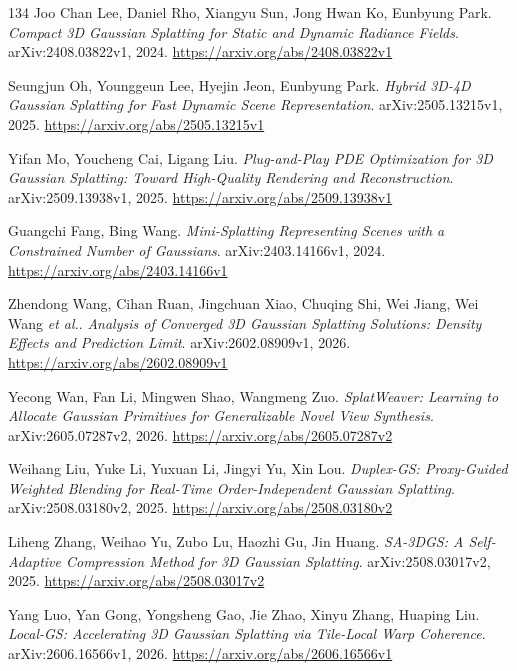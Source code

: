 \documentclass[11pt,a4paper]{article}
\begin{document}
\begin{thebibliography}{134}
Joo Chan Lee, Daniel Rho, Xiangyu Sun, Jong Hwan Ko, Eunbyung Park.
\newblock \emph{Compact 3D Gaussian Splatting for Static and Dynamic Radiance Fields}.
\newblock arXiv:2408.03822v1, 2024.
\newblock \url{https://arxiv.org/abs/2408.03822v1}

Seungjun Oh, Younggeun Lee, Hyejin Jeon, Eunbyung Park.
\newblock \emph{Hybrid 3D-4D Gaussian Splatting for Fast Dynamic Scene Representation}.
\newblock arXiv:2505.13215v1, 2025.
\newblock \url{https://arxiv.org/abs/2505.13215v1}

Yifan Mo, Youcheng Cai, Ligang Liu.
\newblock \emph{Plug-and-Play PDE Optimization for 3D Gaussian Splatting: Toward High-Quality Rendering and Reconstruction}.
\newblock arXiv:2509.13938v1, 2025.
\newblock \url{https://arxiv.org/abs/2509.13938v1}

Guangchi Fang, Bing Wang.
\newblock \emph{Mini-Splatting Representing Scenes with a Constrained Number of Gaussians}.
\newblock arXiv:2403.14166v1, 2024.
\newblock \url{https://arxiv.org/abs/2403.14166v1}

Zhendong Wang, Cihan Ruan, Jingchuan Xiao, Chuqing Shi, Wei Jiang, Wei Wang \emph{et al.}.
\newblock \emph{Analysis of Converged 3D Gaussian Splatting Solutions: Density Effects and Prediction Limit}.
\newblock arXiv:2602.08909v1, 2026.
\newblock \url{https://arxiv.org/abs/2602.08909v1}

Yecong Wan, Fan Li, Mingwen Shao, Wangmeng Zuo.
\newblock \emph{SplatWeaver: Learning to Allocate Gaussian Primitives for Generalizable Novel View Synthesis}.
\newblock arXiv:2605.07287v2, 2026.
\newblock \url{https://arxiv.org/abs/2605.07287v2}

Weihang Liu, Yuke Li, Yuxuan Li, Jingyi Yu, Xin Lou.
\newblock \emph{Duplex-GS: Proxy-Guided Weighted Blending for Real-Time Order-Independent Gaussian Splatting}.
\newblock arXiv:2508.03180v2, 2025.
\newblock \url{https://arxiv.org/abs/2508.03180v2}

Liheng Zhang, Weihao Yu, Zubo Lu, Haozhi Gu, Jin Huang.
\newblock \emph{SA-3DGS: A Self-Adaptive Compression Method for 3D Gaussian Splatting}.
\newblock arXiv:2508.03017v2, 2025.
\newblock \url{https://arxiv.org/abs/2508.03017v2}

Yang Luo, Yan Gong, Yongsheng Gao, Jie Zhao, Xinyu Zhang, Huaping Liu.
\newblock \emph{Local-GS: Accelerating 3D Gaussian Splatting via Tile-Local Warp Coherence}.
\newblock arXiv:2606.16566v1, 2026.
\newblock \url{https://arxiv.org/abs/2606.16566v1}


\end{thebibliography}
\end{document}
